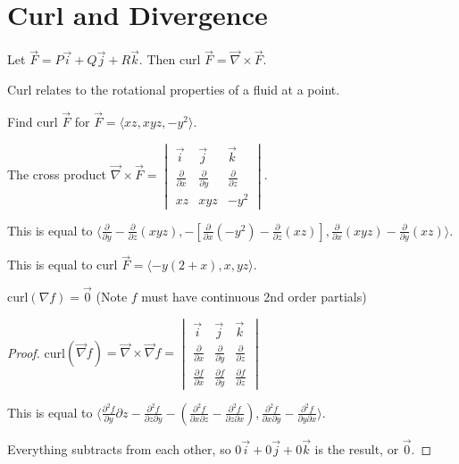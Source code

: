 \documentclass[../calc3.tex]{subfiles}
\begin{document}
\section{Curl and Divergence}
Let $\vec{F}=P\vec{i}+Q\vec{j}+R\vec{k}$. Then curl $\vec{F} = \vec{\nabla}\times \vec{F}$.

Curl relates to the rotational properties of a fluid at a point.

\begin{example}
    Find curl $\vec{F}$ for $\vec{F}=\langle xz,xyz,-y^2\rangle$.

    The cross product $\vec{\nabla}\times \vec{F}=\begin{vmatrix}
        \vec{i}& \vec{j}& \vec{k}\\
        \frac{\partial}{\partial x} & \frac{\partial}{\partial y}&\frac{\partial}{\partial z}\\
        xz & xyz & -y^2
    \end{vmatrix}$.

    This is equal to $\langle \frac{\partial}{\partial y}-\frac{\partial}{\partial z}(xyz),-[\frac{\partial}{\partial x}(-y^2)-\frac{\partial}{\partial z}(xz)], \frac{\partial}{\partial x}(xyz)-\frac{\partial}{\partial y}(xz)\rangle$.

    This is equal to curl $\vec{F}=\langle -y(2+x),x,yz\rangle$.
\end{example}

\begin{theorem}
    curl$(\nabla f)=\vec{0}$ (Note $f$ must have continuous 2nd order partials)
\end{theorem}
\begin{proof}
    curl$(\vec{\nabla}f)=\vec{\nabla}\times \vec{\nabla}f = \begin{vmatrix}
        \vec{i}&\vec{j}&\vec{k}\\
        \frac{\partial}{\partial x}& \frac{\partial}{\partial y}&\frac{\partial}{\partial z}\\
        \frac{\partial f}{\partial x} & \frac{\partial f}{\partial y} & \frac{\partial f}{\partial z}
    \end{vmatrix}$

    This is equal to $\langle \frac{\partial^2 f}{\partial y}{\partial z}-\frac{\partial^2 f}{\partial z\partial y}-\left(\frac{\partial^2 f}{\partial x \partial z}-\frac{\partial^2 f}{\partial z\partial x}\right), \frac{\partial^2 f}{\partial x \partial y}-\frac{\partial^2 f}{\partial y\partial x}\rangle$.

    Everything subtracts from each other, so $0\vec{i}+0\vec{j}+0\vec{k}$ is the result, or $\vec{0}$.
\end{proof}
\end{document}
